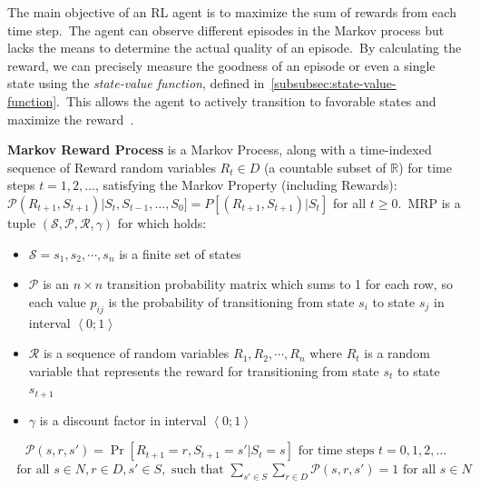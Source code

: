 \documentclass[../xlapes02]{subfiles}
\begin{document}
    The main objective of an RL agent is to maximize the sum of rewards from each time step.\ The agent can observe different episodes in the Markov process but lacks the means to determine the actual quality of an episode.\ By calculating the reward, we can precisely measure the goodness of an episode or even a single state using the \emph{state-value function}, defined in~\cref{subsubsec:state-value-function}.\ This allows the agent to actively transition to favorable states and maximize the reward~\cite{rao2022foundations}.

    \begin{definition}
        \textbf{Markov Reward Process} is a Markov Process, along with a time-indexed sequence of Reward random variables $R_t \in D$ (a countable subset of $\mathbb{R}$) for time steps $t = 1, 2, \ldots$, satisfying the Markov Property (including Rewards): $\mathcal{P}(R_{t+1},S_{t+1})|S_t,S_{t-1}, \ldots, S_0] = P[(R_{t+1}, S_{t+1})|S_t]$ for all $t \geq 0$.\ MRP is a tuple $(\mathcal{S},\mathcal{P},\mathcal{R},\gamma)$ for which holds:\cite{rao2022foundations}
        \begin{itemize}
            \item $\mathcal{S}=s_1,s_2,\cdots,s_n$ is a finite set of states
            \item $\mathcal{P}$ is an $n\times n$ transition probability matrix which sums to 1 for each row, so each value $p_{ij}$ is the probability of transitioning from state $s_i$ to state $s_j$ in interval $\left< 0;1 \right>$
            \item $\mathcal{R}$ is a sequence of random variables $R_1,R_2,\cdots,R_n$ where $R_t$ is a random variable that represents the reward for transitioning from state $s_t$ to state $s_{t+1}$
            \item $\gamma$ is a discount factor in interval $\left<0;1\right>$
        \end{itemize}
        \begin{equation}
            \label{eq:markov-reward-process}
            \mathcal{P}(s,r,s')=\Pr\left[R_{t+1}=r,S_{t+1}=s'|S_t=s\right]\text{ for time steps }t=0,1,2,\ldots
        \end{equation}
        \begin{align*}
            \text{ for all }s\in N,r\in D,s'\in S,\text{ such that }\sum_{s'\in S}\sum_{r\in D}\mathcal{P}(s,r,s')=1\text{ for all }s\in N
        \end{align*}
    \end{definition}
\end{document}
